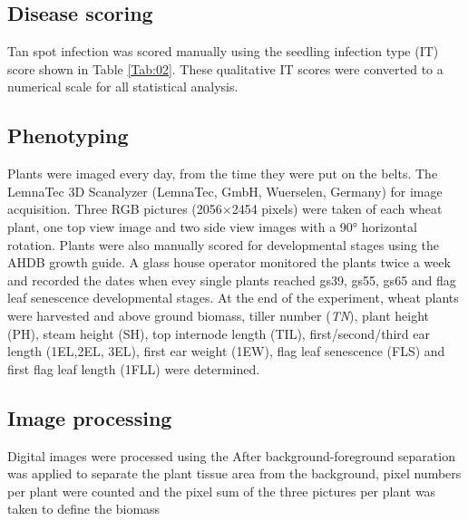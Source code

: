 \documentclass{frontiersSCNS} %
\begin{document}
\subsection{Disease scoring}
Tan spot infection was scored manually using the seedling infection type (IT) score shown in Table \ref{Tab:02}. These qualitative IT scores were converted to a numerical scale for all statistical analysis.

\subsection{Phenotyping}
Plants were imaged every day, from the time they were put on the belts. The LemnaTec 3D Scanalyzer (LemnaTec, GmbH, Wuerselen, Germany) for image acquisition. Three RGB pictures (2056×2454 pixels) were taken of each wheat plant, one top view image and two side view images with a 90° horizontal rotation. Plants were also manually scored for developmental stages using the AHDB growth guide. A glass house operator monitored the plants twice a week and recorded the dates when evey single plants reached gs39, gs55, gs65 and flag leaf senescence developmental stages. At the end of the experiment, wheat plants were harvested and above ground biomass, tiller number (\textit{TN}), plant height (PH), steam height (SH), top internode length (TIL), first/second/third ear length (1EL,2EL, 3EL), first ear weight (1EW), flag leaf senescence (FLS) and first flag leaf length (1FLL) were determined.

\subsection{Image processing}
Digital images were processed using the \cite{MATLAB:2010}
After background-foreground separation was applied to separate the plant tissue area from the background, pixel numbers per plant were counted and the pixel sum of the three pictures per plant was taken to define the biomass %
\end{document}
